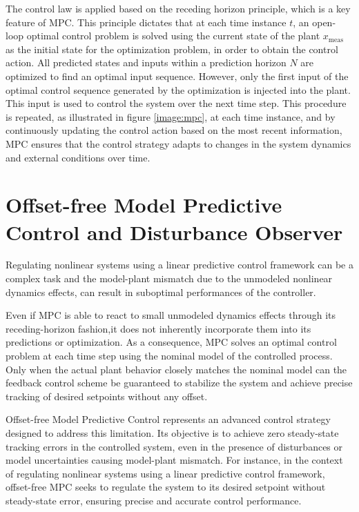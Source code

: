 \documentclass[a4paper,12pt,oneside]{book}
\begin{document}
\bigskip
The control law is applied based on the receding horizon principle, which is a key feature of MPC.
This principle dictates that at each time instance $t$, an open-loop optimal control problem is solved using the current state of the plant $x_{\text{meas}}$ as the initial state for the optimization problem, in order to obtain the control action. 
All predicted states and inputs within a prediction horizon $N$ are optimized to find an optimal input sequence.
However, only the first input of the optimal control sequence generated by the optimization is injected into the plant. 
This input is used to control the system over the next time step.
This procedure is repeated, as illustrated in figure \ref{image:mpc}, at each time instance, and by continuously updating the control action based on the most recent information, MPC ensures that the control strategy adapts to changes in the system dynamics and external conditions over time.




\section{Offset-free Model Predictive Control and Disturbance Observer}
Regulating nonlinear systems using a linear predictive control framework can be a complex task and the model-plant mismatch due to the unmodeled nonlinear dynamics effects, can result in suboptimal performances of the controller.

\bigskip
Even if MPC is able to react to small unmodeled dynamics effects through its receding-horizon fashion,it does not inherently incorporate them into its predictions or optimization.
As a consequence, MPC solves an optimal control problem at each time step using the nominal model of the controlled process. 
Only when the actual plant behavior closely matches the nominal model can the feedback control scheme be guaranteed to stabilize the system and achieve precise tracking of desired setpoints without any offset.

\bigskip
Offset-free Model Predictive Control represents an advanced control strategy designed to address this limitation. 
Its objective is to achieve zero steady-state tracking errors in the controlled system, even in the presence of disturbances or model uncertainties causing model-plant mismatch.
For instance, in the context of regulating nonlinear systems using a linear predictive control framework, offset-free MPC seeks to regulate the system to its desired setpoint without steady-state error, ensuring precise and accurate control performance.
\end{document}
